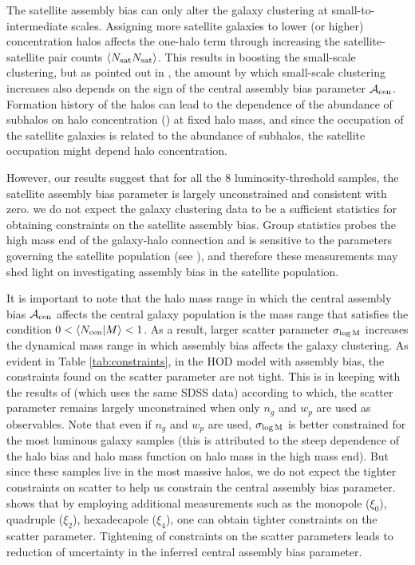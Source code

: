 The satellite assembly bias can only alter the galaxy clustering at small-to-intermediate scales. Assigning more satellite galaxies to lower (or higher) concentration halos affects the one-halo term through increasing the satellite-satellite pair counts $\langle N_{\rm sat} N_{\rm sat} \rangle$. This results in boosting the small-scale clustering, but as pointed out in \citealt{decorated}, the amount by which small-scale clustering increases also depends on the sign of the central assembly bias parameter $\mathcal{A}_{\rm cen}$. Formation history of the halos can lead to the dependence of the abundance of subhalos on halo concentration (\citealt{zentner2005, mao2015}) at fixed halo mass, and since the occupation of the satellite galaxies is related to the abundance of subhalos, the satellite occupation might depend halo concentration. 

However, our results suggest that for all the 8 luminosity-threshold samples, the satellite assembly bias parameter is largely unconstrained and consistent with zero. we do not expect the galaxy clustering data to be a sufficient statistics for obtaining constraints on the satellite assembly bias. Group statistics probes the high mass end of the galaxy-halo connection and is sensitive to the parameters governing the satellite population (see \citealt{sham_gmf, 2016arXiv160701782H}), and therefore these measurements may shed light on investigating assembly bias in the satellite population.   

It is important to note that the halo mass range in which the central assembly bias $\mathcal{A}_{\rm cen}$ affects the central galaxy population is the mass range that satisfies the condition $0<\langle N_{\rm cen}|M \rangle<1$. As a result, larger scatter parameter $\sigma_{\log \rm M}$ increases the dynamical mass range in which assembly bias affects the galaxy clustering. As evident in Table \ref{tab:constraints}, in the HOD model with assembly bias, the constraints found on the scatter parameter are not tight. This is in keeping with the results of \citealt{guo2015} (which uses the same SDSS data) according to which, the scatter parameter remains largely unconstrained when only $n_{g}$ and $w_{p}$ are used as observables. Note that even if $n_{g}$ and $w_{p}$ are used, $\sigma_{\log \rm M}$ is better constrained for the most luminous galaxy samples (this is attributed to the steep dependence of the halo bias and halo mass function on halo mass in the high mass end). But since these samples live in the most massive halos, we do not expect the tighter constraints on scatter to help us constrain the central assembly bias parameter. \citealt{guo2015} shows that by employing additional measurements such as the monopole ($\xi_{0}$), quadruple ($\xi_{2}$), hexadecapole ($\xi_{4}$), one can obtain tighter constraints on the scatter parameter. Tightening of constraints on the scatter parameters leads to reduction of uncertainty in the inferred central assembly bias parameter.    

